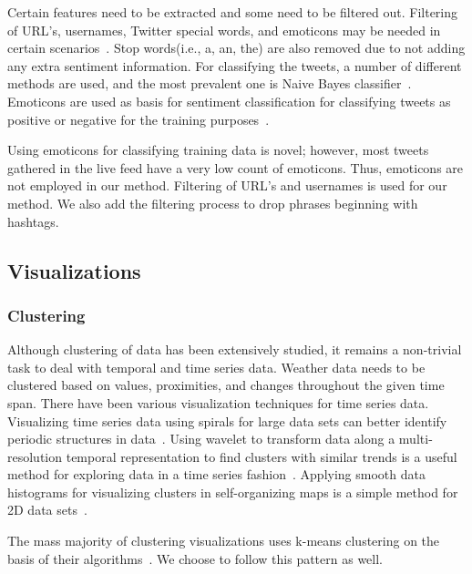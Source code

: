Certain features need to be extracted and some need to be filtered out. Filtering of URL's, usernames, Twitter special words, and emoticons may be needed in certain scenarios~\cite{keller2005warm}. Stop words(i.e., a, an, the) are also removed due to not adding any extra sentiment information. For classifying the tweets, a number of different methods are used, and the most prevalent one is Naive Bayes classifier~\cite{keller2005warm}. Emoticons are used as basis for sentiment classification for classifying tweets as positive or negative for the training purposes~\cite{jain2010data,keller2005warm}.

Using emoticons for classifying training data is novel; however, most tweets gathered in the live feed have a very low count of emoticons. Thus, emoticons are not employed in our method. Filtering of URL's and usernames is used for our method. We also add the filtering process to drop phrases beginning with hashtags.

\subsection{Visualizations}

\subsubsection{Clustering}

Although clustering of data has been extensively studied, it remains a non-trivial task to deal with temporal and time series data. Weather data needs to be clustered based on values, proximities, and changes throughout the given time span. There have been various visualization techniques for time series data. Visualizing time series data using spirals for large data sets can better identify periodic structures in data~\cite{pak2010twitter}. Using wavelet to transform data along a multi-resolution temporal representation to find clusters with similar trends is a useful method for exploring data in a time series fashion~\cite{li2014nasty}. Applying smooth data histograms for visualizing clusters in self-organizing maps is a simple method for 2D data sets~\cite{pampalk2002using}.

The mass majority of clustering visualizations uses k-means clustering on the basis of their algorithms~\cite{li2014nasty,weber2001visualizing}. We choose to follow this pattern as well. 

